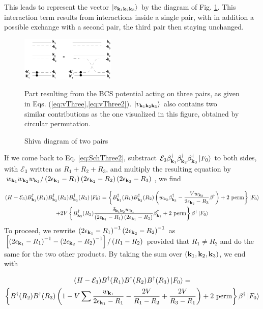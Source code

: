 \documentclass[aps,prb,amsmath,amssymb,preprint,superscriptaddress]{revtex4-1}
\newcommand{\fo}{\ensuremath{\ket{F_0}}}
\renewcommand{\E}{\ensuremath{\mathcal{E}}}
\begin{document}
This leads to represent the vector $\left|v_{\mathbf{k}_1\mathbf{k}_2\mathbf{k}_3}\right>$ by the diagram of Fig. \ref{fig:threeP}. This interaction term results from  interactions inside a single pair, with in addition  a possible exchange with a second pair, the third pair then staying unchanged. 
\begin{figure}[htb]
  \includegraphics[width=0.4\textwidth]{cobosonCooper/threePair.eps}
 \caption{Shiva diagram of two pairs \label{fig:threeP}}
Part resulting from the BCS potential acting on three pairs, as given in Eqs. (\ref{eq:vThree},\ref{eq:vThree2}). $\left|v_{\mathbf{k}_1\mathbf{k}_2\mathbf{k}_3}\right>$ also contains two similar contributions as the one visualized in this figure, obtained by circular permutation. 
\end{figure}

If we come back to Eq. \eqref{eq:SchThree2}, substract $\E_3\beta^{\dagger}_{\vk_1}\beta^{\dagger}_{\vk_2}\beta^{\dagger}_{\vk_3}\fo$ to both sides, with $\E_3$ written as $R_1+R_2+R_3$, and multiply the resulting equation by $w_{\mathbf{k}_1}w_{\mathbf{k}_2}w_{\mathbf{k}_3}/\left(2\epsilon_{\mathbf{k}_1}-R_1\right)\left(2\epsilon_{\mathbf{k}_2}-R_2\right)\left(2\epsilon_{\mathbf{k}_3}-R_3\right)$, we find

\begin{multline}\label{eq:SchThree3}
(H-\E_3)B^{\dagger}_{\vk_1}(R_1)B^{\dagger}_{\vk_2}(R_2)B^{\dagger}_{\vk_3}(R_3)\fo=
\bbr{B^{\dagger}_{\vk_1}(R_1)B^{\dagger}_{\vk_2}(R_2)\br{w_{\vk_3}\beta^{\dagger}_{\vk_3}-\frac{Vw_{\vk_3}}{2\epsilon_{\vk_2}-R_3}\beta^{\dagger}}+\text{2 perm}}\fo\\
+2V\bbr{B^{\dagger}_{\vk_3}(R_3)\frac{\delta_{\vk_1\vk_2}w_{\vk_1}}{\br{2\epsilon_{\vk_1}-R_1}\br{2\epsilon_{\vk_1}-R_2}}\beta^{\dagger}_{\vk_1}+\text{2 perm}}\beta^{\dagger}\fo
\end{multline}
To proceed, we rewrite  $\left(2\epsilon_{\mathbf{k}_1}-R_1\right)^{-1}\left(2\epsilon_{\mathbf{k}_2}-R_2\right)^{-1}$  as 
$\left[\left(2\epsilon_{\mathbf{k}_1}-R_1\right)^{-1}-\left(2\epsilon_{\mathbf{k}_2}-R_2\right)^{-1}\right]/\left(R_1-R_2\right)$ provided that $R_1\neq{}R_2$ and do the same for the two other products. By taking the sum over $\left(\mathbf{k}_1,\mathbf{k}_2,\mathbf{k}_3\right)$, we end with 

\begin{multline}\label{eq:SchThree4}
(H-\E_3)B^{\dagger}(R_1)B^{\dagger}(R_2)B^{\dagger}(R_3)\fo=\\
\bbr{B^{\dagger}(R_2)B^{\dagger}(R_3)\br{1-V\sum\frac{w_{\vk_1}}{2\epsilon_{\vk_1}-R_1}-\frac{2V}{R_1-R_2}+\frac{2V}{R_3-R_1}}+\text{2 perm}}\beta^{\dagger}\fo
\end{multline}
\end{document}
